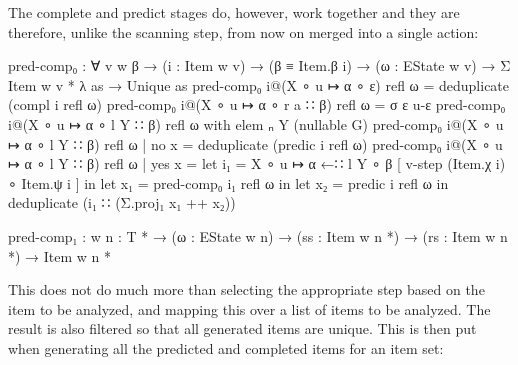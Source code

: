		The complete and predict stages do, however, work together and they are
		therefore, unlike the scanning step, from now on merged into a single
		action:

		\begin{code}
			  pred-comp₀ : ∀ {v w β} →
			    (i : Item w v) →
			    (β ≡ Item.β i) →
			    (ω : EState w v) →
			    Σ {Item w v *} λ as → Unique as
			  pred-comp₀ i@(X ∘ u ↦ α ∘ ε) refl ω = deduplicate (compl i refl ω)
			  pred-comp₀ i@(X ∘ u ↦ α ∘ r a ∷ β) refl ω = σ ε u-ε
			  pred-comp₀ i@(X ∘ u ↦ α ∘ l Y ∷ β) refl ω with elem ₙ Y (nullable G)
			  pred-comp₀ i@(X ∘ u ↦ α ∘ l Y ∷ β) refl ω | no x = deduplicate (predic i refl ω)
			  pred-comp₀ i@(X ∘ u ↦ α ∘ l Y ∷ β) refl ω | yes x =
			    let i₁ = X ∘ u ↦ α ←∷ l Y ∘ β [ v-step (Item.χ i) ∘ Item.ψ i ] in
			    let x₁ = pred-comp₀ i₁ refl ω in
			    let x₂ = predic i refl ω in
			    deduplicate (i₁ ∷ (Σ.proj₁ x₁ ++ x₂))

			  pred-comp₁ : {w n : T *} → (ω : EState w n) →
			    (ss : Item w n *) → (rs : Item w n *) → Item w n *
		\end{code}

		This does not do much more than selecting the appropriate step based on
		the item to be analyzed, and mapping this over a list of items to be
		analyzed. The result is also filtered so that all generated items are
		unique. This is then put when generating all the predicted and
		completed items for an item set:

